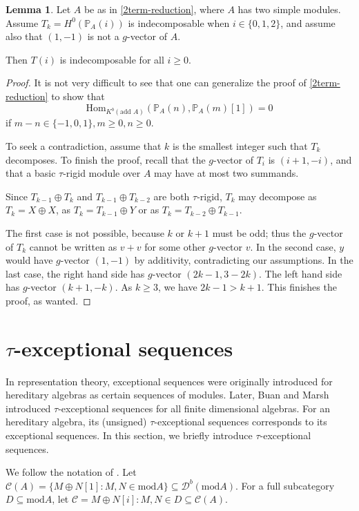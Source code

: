 \documentclass[]{article}
\theoremstyle{definition}
\newtheorem{lemma}{Lemma}[section]
\newcommand{\tu}{\ensuremath{\tau}}
\begin{document}
\begin{lemma}
	Let $A$ be as in \cref{2term-reduction}, where $A$ has two simple modules. Assume $T_k = H^0(\mathbb{P}_A(i))$ is indecomposable when $i \in \{0,1,2\}$, and assume also that $(1,-1)$ is not a $g$-vector of $A$.	
	
	Then $T(i)$ is indecomposable for all $i \geq 0$.
\end{lemma}

\begin{proof}
	 It is not very difficult to see that one can generalize the proof of \cref{2term-reduction} to show that \[\text{Hom}_{K^b(\text{add } A)}(\mathbb{P}_A(n),\mathbb{P}_A(m)[1]) = 0\] if $m-n \in \{-1,0,1\},m \geq 0, n\geq 0$.
	 
	 To seek a contradiction, assume that $k$ is the smallest integer such that $T_k$ decomposes. To finish the proof, recall that the $g$-vector of $T_i$ is $(i+1,-i)$, and that a basic \tu-rigid module over $A$ may have at most two summands.
	 
	 Since $T_{k-1} \oplus T_k$ and $T_{k-1} \oplus T_{k-2}$ are both $\tu$-rigid, $T_k$ may decompose as $T_k = X \oplus X$, as $T_k = T_{k-1} \oplus Y$ or as $T_k = T_{k-2} \oplus T_{k-1}$.
	 
	 The first case is not possible, because $k$ or $k+1$ must be odd; thus the $g$-vector of $T_k$ cannot be written as $v+v$ for some other $g$-vector $v$. In the second case, $y$ would have $g$-vector $(1,-1)$ by additivity, contradicting our assumptions. In the last case, the right hand side has $g$-vector $(2k-1,3-2k)$. The left hand side has $g$-vector $(k+1,-k)$. As $k \geq 3$, we have $2k-1 > k+1$. This finishes the proof, as wanted.
\end{proof}

\section{\tu-exceptional sequences}
In representation theory, exceptional sequences were originally introduced for hereditary algebras\cite{cbw92}\cite{ringel_exceptional} as certain sequences of modules. Later, Buan and Marsh introduced \tu-exceptional sequences\cite{buantau2020} for all finite dimensional algebras. For an hereditary algebra, its (unsigned) \tu-exceptional sequences corresponds to its exceptional sequences. In this section, we briefly introduce \tu-exceptional sequences. 

We follow the notation of \cite{buantau2020}. Let $\mathcal{C}(A) = \{M \oplus N[1] : M,N \in \text{mod} A\} \subseteq \mathcal{D}^b(\text{mod} A)$. For a full subcategory $D \subseteq \text{mod} A$, let $\mathcal{C} = {M \oplus N[i] : M,N \in D} \subseteq \mathcal{C}(A)$.
\end{document}
